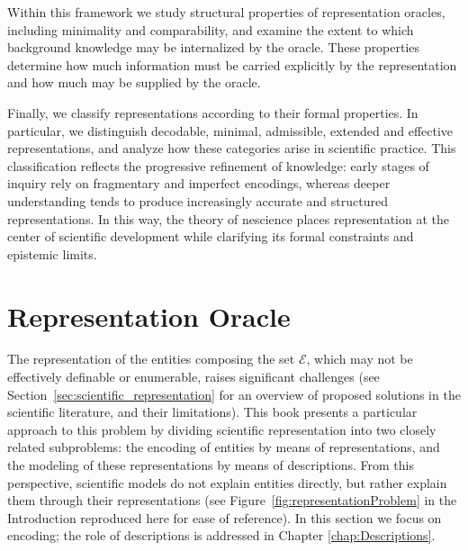 Within this framework we study structural properties of representation oracles, including minimality and comparability, and examine the extent to which background knowledge may be internalized by the oracle. These properties determine how much information must be carried explicitly by the representation and how much may be supplied by the oracle.

Finally, we classify representations according to their formal properties. In particular, we distinguish decodable, minimal, admissible, extended and effective representations, and analyze how these categories arise in scientific practice. This classification reflects the progressive refinement of knowledge: early stages of inquiry rely on fragmentary and imperfect encodings, whereas deeper understanding tends to produce increasingly accurate and structured representations. In this way, the theory of nescience places representation at the center of scientific development while clarifying its formal constraints and epistemic limits.

%
%
\section{Representation Oracle}

The representation of the entities composing the set $\mathcal{E}$, which may not be effectively definable or enumerable, raises significant challenges (see Section~\ref{sec:scientific_representation} for an overview of proposed solutions in the scientific literature, and their limitations). This book presents a particular approach to this problem by dividing scientific representation into two closely related subproblems: the encoding of entities by means of representations, and the modeling of these representations by means of descriptions. From this perspective, scientific models do not explain entities directly, but rather explain them through their representations (see Figure~\ref{fig:representationProblem} in the Introduction reproduced here for ease of reference). In this section we focus on encoding; the role of descriptions is addressed in Chapter \ref{chap:Descriptions}.

% 

